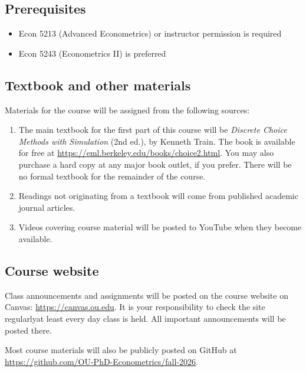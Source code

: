 \documentclass[11pt,english]{article}
\begin{document}
\subsection*{Prerequisites}

\begin{itemize}
\item Econ 5213 (Advanced Econometrics) or instructor permission is required
\item Econ 5243 (Econometrics II) is preferred
\end{itemize}

\subsection*{Textbook and other materials}

Materials for the course will be assigned from the following sources:
\begin{enumerate}
    \item The main textbook for the first part of this course will be \emph{Discrete Choice Methods with Simulation} (2nd ed.), by Kenneth Train. The book is available for free at \url{https://eml.berkeley.edu/books/choice2.html}. You may also purchase a hard copy at any major book outlet, if you prefer. There will be no formal textbook for the remainder of the course.
    \item Readings not originating from a textbook will come from published academic journal articles.
    \item Videos covering course material will be posted to YouTube when they become available.
\end{enumerate}

\subsection*{Course website}

Class announcements and assignments will be posted on the course website on Canvas: \url{https://canvas.ou.edu}. It is your responsibility to check the site regularly\textemdash at least every day class is held. All important announcements will be posted there.

Most course materials will also be publicly posted on GitHub at \url{https://github.com/OU-PhD-Econometrics/fall-2026}.
\end{document}
